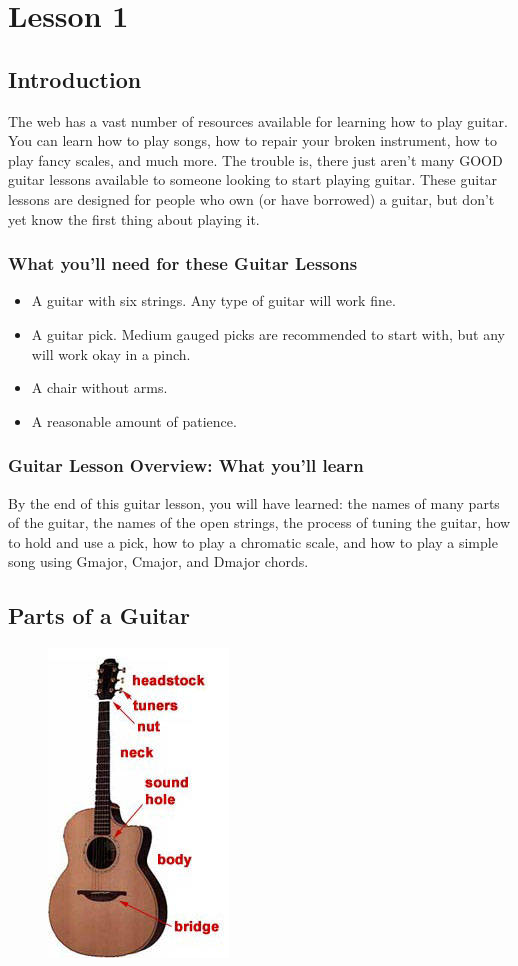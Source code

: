 \chapter{Lesson 1}
\section{Introduction}
The web has a vast number of resources available for learning how to play
guitar. You can learn how to play songs, how to repair your broken instrument,
how to play fancy scales, and much more. The trouble is, there just aren't many
GOOD guitar lessons available to someone looking to start playing guitar. These
guitar lessons are designed for people who own (or have borrowed) a guitar, but
don't yet know the first thing about playing it.

\subsection{What you'll need for these Guitar Lessons}
%
\begin{itemize}
\item A guitar with six strings. Any type of guitar will work fine.
\item A guitar pick. Medium gauged picks are recommended to start with, but any
      will work okay in a pinch.
\item A chair without arms.
\item A reasonable amount of patience.
\end{itemize}
%
\subsection{Guitar Lesson Overview: What you'll learn}
By the end of this guitar lesson, you will have learned: the names of many
parts of the guitar, the names of the open strings, the process of tuning the
guitar, how to hold and use a pick, how to play a chromatic scale, and how to
play a simple song using Gmajor, Cmajor, and Dmajor chords. 

\section{Parts of a Guitar}
\begin{figure}
\includegraphics{partone/partsofaguitar.jpg}
\end{figure}

